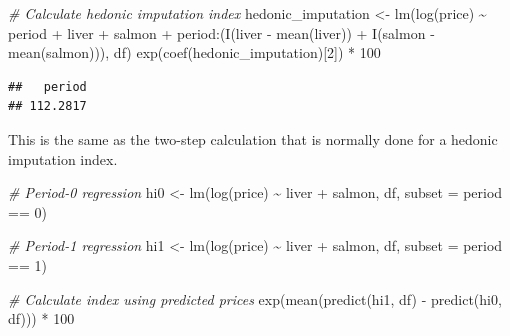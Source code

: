 \documentclass[
]{article}
\newenvironment{Shaded}{\begin{snugshade}}{\end{snugshade}}
\newcommand{\AttributeTok}[1]{\textcolor[rgb]{0.77,0.63,0.00}{#1}}
\newcommand{\CommentTok}[1]{\textcolor[rgb]{0.56,0.35,0.01}{\textit{#1}}}
\newcommand{\DecValTok}[1]{\textcolor[rgb]{0.00,0.00,0.81}{#1}}
\newcommand{\FunctionTok}[1]{\textcolor[rgb]{0.00,0.00,0.00}{#1}}
\newcommand{\NormalTok}[1]{#1}
\newcommand{\OtherTok}[1]{\textcolor[rgb]{0.56,0.35,0.01}{#1}}
\newcommand{\SpecialCharTok}[1]{\textcolor[rgb]{0.00,0.00,0.00}{#1}}
\begin{document}
\begin{Shaded}
\begin{Highlighting}[]
\CommentTok{\# Calculate hedonic imputation index}
\NormalTok{hedonic\_imputation }\OtherTok{\textless{}{-}} \FunctionTok{lm}\NormalTok{(}\FunctionTok{log}\NormalTok{(price) }\SpecialCharTok{\textasciitilde{}}\NormalTok{ period }\SpecialCharTok{+}\NormalTok{ liver }\SpecialCharTok{+}\NormalTok{ salmon }\SpecialCharTok{+} 
\NormalTok{                           period}\SpecialCharTok{:}\NormalTok{(}\FunctionTok{I}\NormalTok{(liver }\SpecialCharTok{{-}} \FunctionTok{mean}\NormalTok{(liver)) }\SpecialCharTok{+} \FunctionTok{I}\NormalTok{(salmon }\SpecialCharTok{{-}} \FunctionTok{mean}\NormalTok{(salmon))), }
\NormalTok{                         df)}
\FunctionTok{exp}\NormalTok{(}\FunctionTok{coef}\NormalTok{(hedonic\_imputation)[}\DecValTok{2}\NormalTok{]) }\SpecialCharTok{*} \DecValTok{100}
\end{Highlighting}
\end{Shaded}

\begin{verbatim}
##   period 
## 112.2817
\end{verbatim}

This is the same as the two-step calculation that is normally done for a hedonic imputation index.

\begin{Shaded}
\begin{Highlighting}[]
\CommentTok{\# Period{-}0 regression}
\NormalTok{hi0 }\OtherTok{\textless{}{-}} \FunctionTok{lm}\NormalTok{(}\FunctionTok{log}\NormalTok{(price) }\SpecialCharTok{\textasciitilde{}}\NormalTok{ liver }\SpecialCharTok{+}\NormalTok{ salmon, df, }\AttributeTok{subset =}\NormalTok{ period }\SpecialCharTok{==} \DecValTok{0}\NormalTok{)}

\CommentTok{\# Period{-}1 regression}
\NormalTok{hi1 }\OtherTok{\textless{}{-}} \FunctionTok{lm}\NormalTok{(}\FunctionTok{log}\NormalTok{(price) }\SpecialCharTok{\textasciitilde{}}\NormalTok{ liver }\SpecialCharTok{+}\NormalTok{ salmon, df, }\AttributeTok{subset =}\NormalTok{ period }\SpecialCharTok{==} \DecValTok{1}\NormalTok{)}

\CommentTok{\# Calculate index using predicted prices}
\FunctionTok{exp}\NormalTok{(}\FunctionTok{mean}\NormalTok{(}\FunctionTok{predict}\NormalTok{(hi1, df) }\SpecialCharTok{{-}} \FunctionTok{predict}\NormalTok{(hi0, df))) }\SpecialCharTok{*} \DecValTok{100}
\end{Highlighting}
\end{Shaded}
\end{document}
